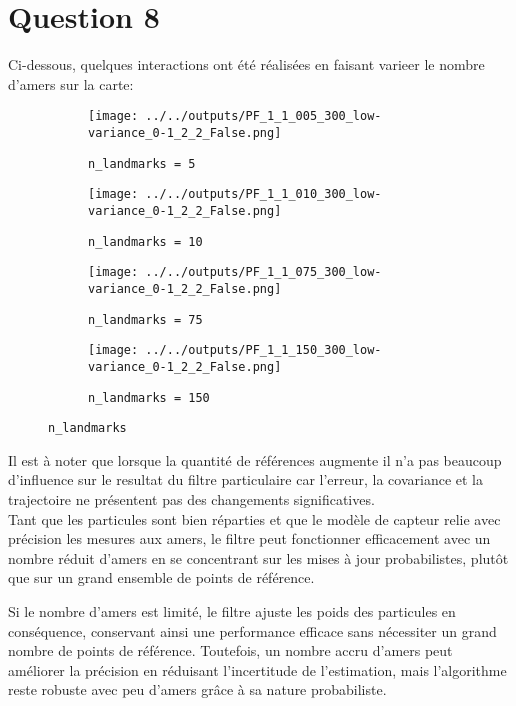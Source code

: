 \documentclass[../CSC_5RO12_TA_TP3.tex]{subfiles}
\begin{document}
\section{Question 8}
\noindent Ci-dessous, quelques interactions ont été réalisées en faisant varieer le nombre d'amers sur la carte:
\begin{figure}[H]
    \centering
    \begin{subfigure}[b]{0.475\textwidth}
        \centering
        \texttt{[image: ../../outputs/PF\_1\_1\_005\_300\_low-variance\_0-1\_2\_2\_False.png]}
        \caption{\texttt{n\_landmarks = 5}}
        \label{}
    \end{subfigure}\hfill
    \begin{subfigure}[b]{0.475\textwidth}
        \centering
        \texttt{[image: ../../outputs/PF\_1\_1\_010\_300\_low-variance\_0-1\_2\_2\_False.png]}
        \caption{\texttt{n\_landmarks = 10}}
        \label{}
    \end{subfigure}
    \begin{subfigure}[b]{0.475\textwidth}
        \centering
        \texttt{[image: ../../outputs/PF\_1\_1\_075\_300\_low-variance\_0-1\_2\_2\_False.png]}
        \caption{\texttt{n\_landmarks = 75}}
        \label{}
    \end{subfigure}\hfill
    \begin{subfigure}[b]{0.475\textwidth}
        \centering
        \texttt{[image: ../../outputs/PF\_1\_1\_150\_300\_low-variance\_0-1\_2\_2\_False.png]}
        \caption{\texttt{n\_landmarks = 150}}
        \label{}
    \end{subfigure}
    \caption{\texttt{n\_landmarks}}
    \label{}
\end{figure}
\noindent Il est à noter que lorsque la quantité de références augmente il n'a pas beaucoup d'influence sur le resultat du filtre particulaire car l'erreur, la covariance et la trajectoire ne présentent pas des changements significatives.\\

\noindent Tant que les particules sont bien réparties et que le modèle de capteur relie avec précision les mesures aux amers, le filtre peut fonctionner efficacement avec un nombre réduit d'amers en se concentrant sur les mises à jour probabilistes, plutôt que sur un grand ensemble de points de référence.

\begin{remark}
    Si le nombre d'amers est limité, le filtre ajuste les poids des particules en conséquence, conservant ainsi une performance efficace sans nécessiter un grand nombre de points de référence. Toutefois, un nombre accru d'amers peut améliorer la précision en réduisant l'incertitude de l'estimation, mais l'algorithme reste robuste avec peu d'amers grâce à sa nature probabiliste.
\end{remark}
\end{document}
